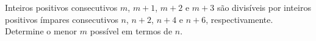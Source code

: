 Inteiros positivos consecutivos $m$, $m+1$, $m+2$ e $m+3$ são divisíveis por inteiros positivos ímpares consecutivos $n$, $n+2$, $n+4$ e $n+6$, respectivamente. Determine o menor $m$ possível em termos de $n$.